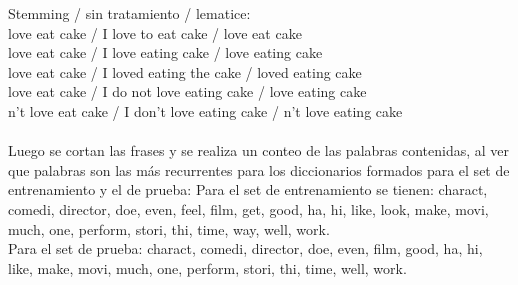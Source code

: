 \documentclass[letter, 10pt]{article}
\begin{document}
Stemming		/	sin tratamiento		/	lematice:\\
love eat cake		/	I love to eat cake		/	love eat cake\\
love eat cake		/	I love eating cake		/ 	love eating cake\\
love eat cake		/	I loved eating the cake	/	loved eating cake\\
love eat cake		/	I do not love eating cake	/ 	love eating cake\\
n't love eat cake	/	I don't love eating cake	/ 	n't love eating cake\\\\
Luego se cortan las frases y se realiza un conteo de las palabras contenidas, al ver que palabras son las más recurrentes para los diccionarios formados para el set de entrenamiento y el de prueba:
Para el set de entrenamiento se tienen: charact, comedi, director, doe, even, feel, film, get, good, ha, hi, like, look, make, movi, much, one, perform, stori, thi, time, way, well, work.\\

Para el set de prueba: charact, comedi, director, doe, even, film, good, ha, hi, like, make, movi, much, one, perform, stori, thi, time, well, work.\\
\end{document}
